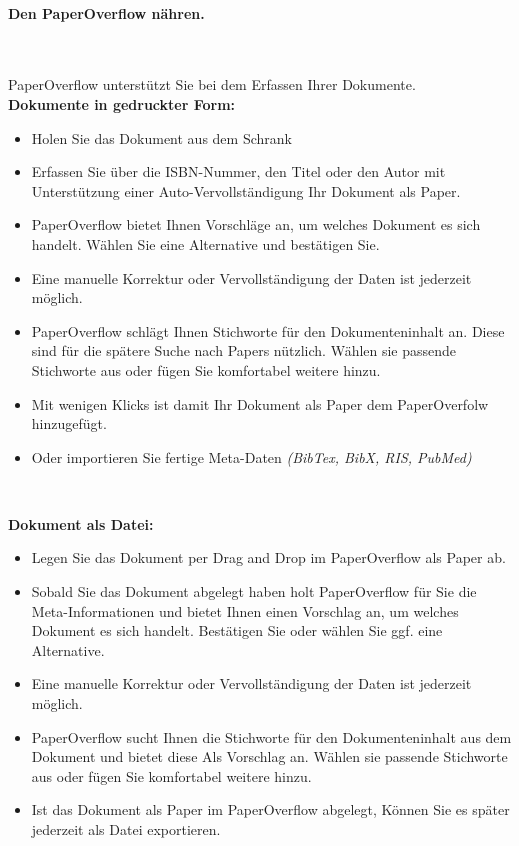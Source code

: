 \documentclass[a4paper,12pt]{article}
\begin{document}
\paragraph{Den PaperOverflow nähren.}\

PaperOverflow unterstützt Sie bei dem Erfassen Ihrer Dokumente. \\

\textbf{Dokumente in gedruckter Form:} 
\begin{itemize}
	\item Holen Sie das Dokument aus dem Schrank
	\item Erfassen Sie über die ISBN-Nummer, den Titel oder den Autor mit Unterstützung einer Auto-Vervollständigung Ihr Dokument als Paper.
	\item PaperOverflow bietet Ihnen Vorschläge an, um welches Dokument es sich handelt. Wählen Sie eine Alternative und bestätigen Sie. 
	\item Eine manuelle Korrektur oder Vervollständigung der Daten ist jederzeit möglich.
	\item PaperOverflow schlägt Ihnen Stichworte für den Dokumenteninhalt an. Diese sind für die spätere Suche nach Papers nützlich. Wählen sie passende Stichworte aus oder fügen Sie komfortabel weitere hinzu.
	\item Mit wenigen Klicks ist damit Ihr Dokument als Paper dem PaperOverfolw hinzugefügt.
	\item Oder importieren Sie fertige Meta-Daten \textit{(BibTex, BibX, RIS, PubMed)}
\end{itemize} \

\textbf{Dokument als Datei:}
\begin{itemize}
	\item Legen Sie das Dokument per Drag and Drop im PaperOverflow als Paper ab.
	\item Sobald Sie das Dokument abgelegt haben holt PaperOverflow für Sie die Meta-Informationen und bietet Ihnen einen Vorschlag an, um welches Dokument es sich handelt. Bestätigen Sie oder wählen Sie ggf. eine Alternative.
	\item Eine manuelle Korrektur oder Vervollständigung der Daten ist jederzeit möglich.
	\item PaperOverflow sucht Ihnen die Stichworte für den Dokumenteninhalt aus dem Dokument und bietet diese Als Vorschlag an. Wählen sie passende Stichworte aus oder fügen Sie komfortabel weitere hinzu.
	\item Ist das Dokument als Paper im PaperOverflow abgelegt, Können Sie es später jederzeit als Datei exportieren.
\end{itemize}\ 
\end{document}
